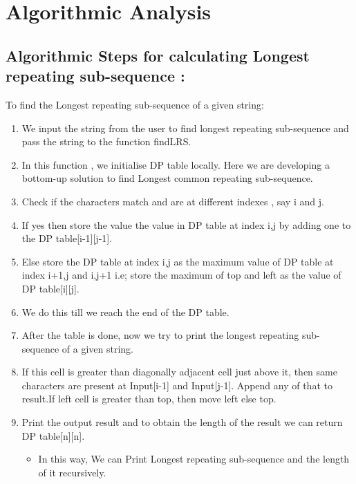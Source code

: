 \documentclass[conference]{IEEEtran}
\begin{document}
\section{Algorithmic Analysis}


\subsection{Algorithmic Steps for calculating Longest repeating sub-sequence :}\label{AA}
To find the Longest repeating sub-sequence of a given string: 

\begin{enumerate}
\item We input the string from the user to find longest repeating sub-sequence and  pass the string to the function findLRS.
\item In this function , we initialise DP table locally. Here we are developing a bottom-up solution to find Longest common repeating sub-sequence.
\item Check if the characters match and are at different indexes , say i and j.
\item If yes then store the value the value in DP table at index i,j by adding one to the DP table[i-1][j-1].
\item Else store the DP table at index i,j as the maximum value of DP table at index i+1,j and i,j+1 i.e; store the maximum of top and left as the value of DP table[i][j].
\item We do this till we reach the end of the DP table.
\item After the table is done, now we try to print the longest repeating sub-sequence of a given string.
\item If this cell is greater than diagonally adjacent cell just above it, then same characters are present at Input[i-1] and Input[j-1]. Append any of that to result.If left cell is greater than top, then move left else top.
 \item Print the output result and to obtain the length of the result we can return DP table[n][n]. 
\begin{itemize}
\item In this way, We can Print Longest repeating sub-sequence and the length of it recursively.
\end{itemize}
\end{enumerate}
\end{document}
